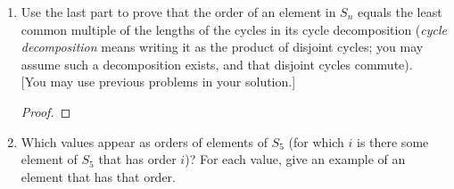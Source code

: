 \documentclass[11pt, reqno]{amsart}
\theoremstyle{plain}
\theoremstyle{definition}
\theoremstyle{example}
\begin{document}
\begin{enumerate}[1.]
\begin{enumerate}
\begin{proof}
	If for some $j$ we have $k + j = m+1$, then $a_{k+j} = a_1$	
	
	\end{proof}


	\item Use the last part to prove that the order of an element in $S_n$ equals the least common multiple of the lengths of the cycles in its cycle decomposition (\emph{cycle decomposition} means writing it as the product of disjoint cycles; you may assume such a decomposition exists, and that disjoint cycles commute).\\
	 {[You may use previous problems in your solution.]}
	
	\begin{proof}
	
	\end{proof}
	
	\item Which values appear as orders of elements of $S_5$ (for which $i$ is there some element of $S_5$ that has order $i$)? For each value, give an example of an element that has that order. 
\end{enumerate}



\end{enumerate}
\end{document}

